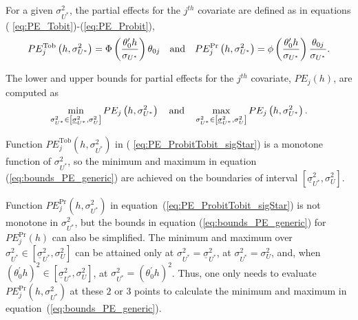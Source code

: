\documentclass[12pt]{article}
\begin{document}
{}For a given $\sigma _{U^{\ast }}^{2}$,
the partial effects for the $j^{th}$ covariate are defined as in equations (%
\ref{eq:PE_Tobit})-(\ref{eq:PE_Probit}),%
\begin{equation}
PE_{j}^{\text{Tob}}\left( h,\sigma _{U^{\ast }}^{2}\right) =\Phi \left( 
\frac{\theta _{0}^{\prime }h}{\sigma _{U^{\ast }}}\right) \theta _{0j}\text{
\ \ and \ \ }PE_{j}^{\Pr }\left( h,\sigma _{U^{\ast }}^{2}\right) =\phi
\left( \frac{\theta _{0}^{\prime }h}{\sigma _{U^{\ast }}}\right) \frac{%
\theta _{0j}}{\sigma _{U^{\ast }}}.  \label{eq:PE_ProbitTobit_sigStar}
\end{equation}

The lower and upper bounds for partial effects for the $j^{th}$ covariate, $%
PE_{j}\left( h\right) $, are computed as 
\begin{equation}
\min_{\sigma _{U^{\ast }}^{2}\in \left[ \underline{\sigma }_{U^{\ast
}}^{2},\sigma _{U}^{2}\right] }PE_{j}\left( h,\sigma _{U^{\ast }}^{2}\right) 
\text{\quad and\quad }\max_{\sigma _{U^{\ast }}^{2}\in \left[ \underline{%
\sigma }_{U^{\ast }}^{2},\sigma _{U}^{2}\right] }PE_{j}\left( h,\sigma
_{U^{\ast }}^{2}\right) .  \label{eq:bounds_PE_generic}
\end{equation}

Function $PE_{j}^{\text{Tob}}\left( h,\sigma _{U^{\ast }}^{2}\right) $ in (%
\ref{eq:PE_ProbitTobit_sigStar}) is a monotone function of $\sigma _{U^{\ast
}}^{2}$, so the minimum and maximum in equation (\ref{eq:bounds_PE_generic})
are achieved on the boundaries of interval $\left[ \underline{\sigma }%
_{U^{\ast }}^{2},\sigma _{U}^{2}\right] $.

Function $PE_{j}^{\Pr }\left( h,\sigma _{U^{\ast }}^{2}\right) $ in
equation~(\ref{eq:PE_ProbitTobit_sigStar}) is not monotone in $\sigma
_{U^{\ast }}^{2}$, but the bounds in equation (\ref{eq:bounds_PE_generic})
for $PE_{j}^{\Pr }\left( h\right) $ can also be simplified. The minimum and
maximum over $\sigma _{U^{\ast }}^{2}\in \left[ \underline{\sigma }_{U^{\ast
}}^{2},\sigma _{U}^{2}\right] $ can be attained only at $\sigma _{U^{\ast
}}^{2}=\underline{\sigma }_{U^{\ast }}^{2}$, at $\sigma _{U^{\ast
}}^{2}=\sigma _{U}^{2}$, and, when $\left( \theta _{0}^{\prime }h\right)
^{2}\in \left[ \underline{\sigma }_{U^{\ast }}^{2},\sigma _{U}^{2}\right] $,
at $\sigma _{U^{\ast }}^{2}=\left( \theta _{0}^{\prime }h\right) ^{2}$.
Thus, one only needs to evaluate $PE_{j}^{\Pr }\left( h,\sigma _{U^{\ast
}}^{2}\right) $ at these $2$ or $3$ points to calculate the minimum and
maximum in equation~(\ref{eq:bounds_PE_generic}).
\end{document}
